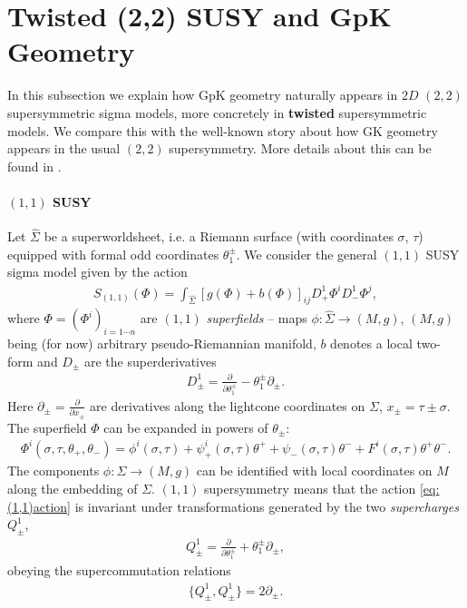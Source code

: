 \documentclass{article}
\newcommand{\p}{\partial}
\theoremstyle{definition}
\theoremstyle{definition}
\theoremstyle{remark}
\begin{document}
\section{Twisted (2,2) SUSY and GpK Geometry}\label{sec:susy_gpk}
In this subsection we explain how GpK geometry naturally appears in $2D$ $(2,2)$ supersymmetric sigma models, more concretely in {\bf twisted} supersymmetric models. We compare this with the well-known story about how GK geometry appears in the usual $(2,2)$ supersymmetry. More details about this can be found in \cite{HullTwistedSUSY,royston2005geometry}. 

\paragraph*{$(1,1)$ SUSY} Let $\hat{\Sigma}$ be a superworldsheet, i.e. a Riemann surface (with coordinates $\sigma$, $\tau$) equipped with formal odd coordinates $\theta^\pm_1$. We consider the general $(1,1)$ SUSY sigma model given by the action
\begin{align}\label{eq:(1,1)action}
S_{(1,1)}(\Phi)=\int_{\hat{\Sigma}}[g(\Phi)+b(\Phi)]_{ij}D^1_+\Phi^iD^1_-\Phi^j,
\end{align}
where $\Phi=(\Phi^i)_{i=1\cdots n}$ are $(1,1)$ {\it superfields} -- maps $\phi: \hat{\Sigma} \rightarrow (M,g)$, $(M,g)$ being (for now) arbitrary pseudo-Riemannian manifold, $b$ denotes a local two-form and $D_\pm$ are the superderivatives
\begin{align}\label{eq:D1}
D^1_\pm=\frac{\p}{\p \theta_1^\pm}-\theta_1^\pm \p_\pm.
\end{align}
Here $\p_\pm=\frac{\p}{\p x_\pm}$ are derivatives along the lightcone coordinates on $\Sigma$, $x_\pm=\tau\pm\sigma$. The superfield $\Phi$ can be expanded in powers of $\theta_\pm$:
\begin{align*}
\Phi^i(\sigma,\tau,\theta_+,\theta_-)=\phi^i(\sigma,\tau)+\psi^i_+(\sigma,\tau)\theta^++\psi_-(\sigma,\tau)\theta^-+F^i(\sigma,\tau)\theta^+\theta^-.
\end{align*}
The components $\phi: \Sigma \rightarrow (M,g)$ can be identified with local coordinates on $M$ along the embedding of $\Sigma$. $(1,1)$ supersymmetry means that the action \eqref{eq:(1,1)action} is invariant under transformations generated by the two {\it supercharges} $Q^1_\pm$, 
\begin{align}\label{eq:Q1}
Q^1_\pm=\frac{\p}{\p \theta_1^\pm}+\theta_1^\pm \p_\pm,
\end{align}
obeying the supercommutation relations
\begin{align}\label{eq:(1,1)_susy}
\{Q^1_\pm,Q^1_\pm\}=2\p_\pm.
\end{align}
\end{document}
